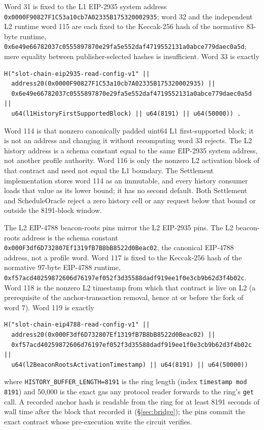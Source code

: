 \documentclass[a4paper,11pt]{article}
\newcommand{\code}[1]{\nolinkurl{#1}}
\begin{document}
Word 31 is fixed to the L1 EIP-2935 system address
\code{0x0000F90827F1C53a10cb7A02335B175320002935}; word 32 and the independent
L2 runtime word 115 are each fixed to the Keccak-256 hash of the normative
83-byte runtime,
\code{0x6e49e66782037c0555897870e29fa5e552daf4719552131a0abce779daec0a5d};
mere equality between publisher-selected hashes is insufficient.  Word 33 is
exactly
\begin{verbatim}
H("slot-chain-eip2935-read-config-v1" ||
  address20(0x0000F90827F1C53a10cb7A02335B175320002935) ||
  0x6e49e66782037c0555897870e29fa5e552daf4719552131a0abce779daec0a5d ||
  u64(l1HistoryFirstSupportedBlock) || u64(8191) || u64(50000)) .
\end{verbatim}
Word 114 is that nonzero canonically padded uint64 L1 first-supported block; it
is not an address and changing it without recomputing word 33 rejects.  The L2
history address is a schema constant equal to the same EIP-2935 system address,
not another profile authority.  Word 116 is only the nonzero L2 activation
block of that contract and need not equal the L1 boundary.  The Settlement
implementation stores word 114 as an immutable, and every history consumer
loads that value as its lower bound; it has no second default.  Both
Settlement and ScheduleOracle reject a zero history cell or any request below
that bound or outside the 8191-block window.

The L2 EIP-4788 beacon-roots pins mirror the L2 EIP-2935 pins.  The L2
beacon-roots address is the schema constant
\code{0x000F3df6D732807Ef1319fB7B8bB8522d0Beac02}, the canonical EIP-4788
address, not a profile word.  Word 117 is fixed to the Keccak-256 hash of the
normative 97-byte EIP-4788 runtime,
\code{0xf57acd40259872606d76197ef052f3d35588dadf919ee1f0e3cb9b62d3f4b02c}.
Word 118 is the nonzero L2 timestamp from which that contract is live on L2
(a prerequisite of the anchor-transaction removal, hence at or before the
fork of word 7).  Word 119 is exactly
\begin{verbatim}
H("slot-chain-eip4788-read-config-v1" ||
  address20(0x000F3df6D732807Ef1319fB7B8bB8522d0Beac02) ||
  0xf57acd40259872606d76197ef052f3d35588dadf919ee1f0e3cb9b62d3f4b02c ||
  u64(l2BeaconRootsActivationTimestamp) || u64(8191) || u64(50000))
\end{verbatim}
where \code{HISTORY_BUFFER_LENGTH=8191} is the ring length (index
\code{timestamp mod 8191}) and 50,000 is the exact gas any protocol reader
forwards to the ring's \code{get} call.  A recorded anchor hash is readable
from the ring for at least 8191 seconds of wall time after the block that
recorded it (\S\ref{sec:bridge}); the pins commit the exact contract whose
pre-execution write the circuit verifies.
\end{document}
